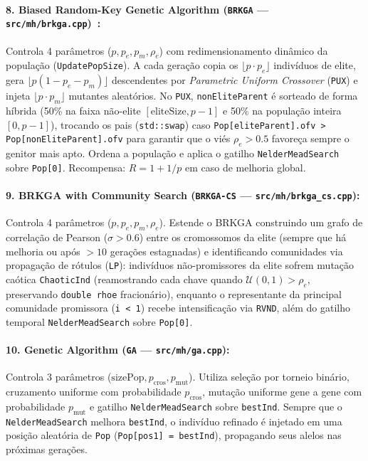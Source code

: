 \documentclass[11pt,a4paper]{article}
\begin{document}
\paragraph{8. Biased Random-Key Genetic Algorithm (\texttt{BRKGA} --- \texttt{src/mh/brkga.cpp})~\cite{goncalves2011brkga}:}
Controla 4 parâmetros ($p, p_e, p_m, \rho_e$) com redimensionamento dinâmico da população (\texttt{UpdatePopSize}). A cada geração copia os $\lfloor p \cdot p_e \rfloor$ indivíduos de elite, gera $\lfloor p(1 - p_e - p_m) \rfloor$ descendentes por \emph{Parametric Uniform Crossover} (\texttt{PUX}) e injeta $\lfloor p \cdot p_m \rfloor$ mutantes aleatórios. No \texttt{PUX}, \texttt{nonEliteParent} é sorteado de forma híbrida (50\% na faixa não-elite $[\text{eliteSize}, p-1]$ e 50\% na população inteira $[0, p-1]$), trocando os pais (\texttt{std::swap}) caso \texttt{Pop[eliteParent].ofv > Pop[nonEliteParent].ofv} para garantir que o viés $\rho_e > 0.5$ favoreça sempre o genitor mais apto. Ordena a população e aplica o gatilho \texttt{NelderMeadSearch} sobre \texttt{Pop[0]}. Recompensa: $R = 1 + 1/p$ em caso de melhoria global.

\paragraph{9. BRKGA with Community Search (\texttt{BRKGA-CS} --- \texttt{src/mh/brkga\_cs.cpp}):}
Controla 4 parâmetros ($p, p_e, p_m, \rho_e$). Estende o BRKGA construindo um grafo de correlação de Pearson ($\sigma > 0.6$) entre os cromossomos da elite (sempre que há melhoria ou após $>10$ gerações estagnadas) e identificando comunidades via propagação de rótulos (\texttt{LP}): indivíduos não-promissores da elite sofrem mutação caótica \texttt{ChaoticInd} (reamostrando cada chave quando $\mathcal{U}(0,1) > \rho_e$, preservando \texttt{double rhoe} fracionário), enquanto o representante da principal comunidade promissora (\texttt{i < 1}) recebe intensificação via \texttt{RVND}, além do gatilho temporal \texttt{NelderMeadSearch} sobre \texttt{Pop[0]}.

\paragraph{10. Genetic Algorithm (\texttt{GA} --- \texttt{src/mh/ga.cpp}):}
Controla 3 parâmetros ($\text{sizePop}, p_{\text{cros}}, p_{\text{mut}}$). Utiliza seleção por torneio binário, cruzamento uniforme com probabilidade $p_{\text{cros}}$, mutação uniforme gene a gene com probabilidade $p_{\text{mut}}$ e gatilho \texttt{NelderMeadSearch} sobre \texttt{bestInd}. Sempre que o \texttt{NelderMeadSearch} melhora \texttt{bestInd}, o indivíduo refinado é injetado em uma posição aleatória de \texttt{Pop} (\texttt{Pop[pos1] = bestInd}), propagando seus alelos nas próximas gerações.
\end{document}
